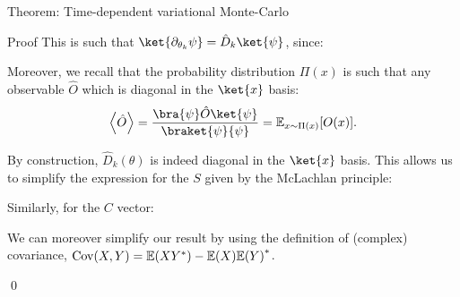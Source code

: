 \documentclass[a4paper]{article}
\begin{document}
\begin{parag}{Theorem: Time-dependent variational Monte-Carlo}
\begin{subparag}{Proof}
        This is such that $\ket{\partial_{\theta_k} \psi} = \hat{D}_k \ket{\psi}$, since:

        Moreover, we recall that the probability distribution $\Pi\left(x\right)$ is such that any observable $\hat{O}$ which is diagonal in the $\ket{x}$ basis: 
        \[\left\langle \hat{O} \right\rangle = \frac{\bra{\psi} \hat{O} \ket{\psi}}{\braket{\psi}{\psi}} = \exval_{x \followsdistr \Pi\left(x\right)}\left[O\left(x\right)\right].\]

        By construction, $\hat{D}_k\left(\theta\right)$ is indeed diagonal in the $\ket{x}$ basis. This allows us to simplify the expression for the $S$ given by the McLachlan principle:

        Similarly, for the $C$ vector:

        We can moreover simplify our result by using the definition of (complex) covariance, $\Cov\left(X, Y\right) = \exval\left(X Y^*\right) - \exval\left(X\right)\exval\left(Y\right)^*$.

        \qed

    \end{subparag}
\end{parag}
\end{document}
